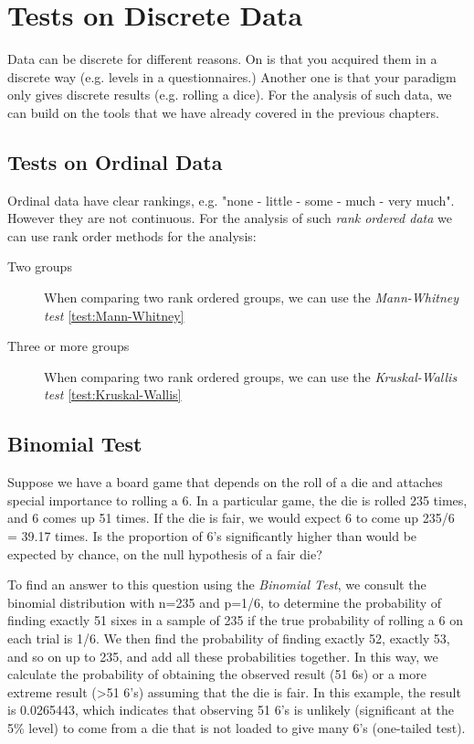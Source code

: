 \chapter{Tests on Discrete Data}

Data can be discrete for different reasons. On is that you acquired them in a discrete way (e.g. levels in a questionnaires.) Another one is that your paradigm only gives discrete results (e.g. rolling a dice). For the analysis of such data, we can build on the tools that we have already covered in the previous chapters.

\section{Tests on Ordinal Data}

Ordinal data have clear rankings, e.g. "none - little - some - much - very much". However they are not continuous. For the analysis of such \emph{rank ordered data} we can use rank order methods for the analysis:

\begin{description}
  \item[Two groups] When comparing two rank ordered groups, we can use the \emph{Mann-Whitney test} \ref{test:Mann-Whitney}
  \item[Three or more groups]  When comparing two rank ordered groups, we can use the \emph{Kruskal-Wallis test} \ref{test:Kruskal-Wallis}

\end{description}

\section{Binomial Test}

Suppose we have a board game that depends on the roll of a die and attaches special importance to rolling a 6. In a particular game, the die is rolled 235 times, and 6 comes up 51 times. If the die is fair, we would expect 6 to come up 235/6 = 39.17 times. Is the proportion of 6's significantly higher than would be expected by chance, on the null hypothesis of a fair die?

To find an answer to this question using the \emph{Binomial Test}, we consult the binomial distribution with n=235 and p=1/6, to determine the probability of finding exactly 51 sixes in a sample of 235 if the true probability of rolling a 6 on each trial is 1/6. We then find the probability of finding exactly 52, exactly 53, and so on up to 235, and add all these probabilities together. In this way, we calculate the probability of obtaining the observed result (51 6s) or a more extreme result (>51 6's) assuming that the die is fair. In this example, the result is 0.0265443, which indicates that observing 51 6's is unlikely (significant at the 5\% level) to come from a die that is not loaded to give many 6's (one-tailed test).

